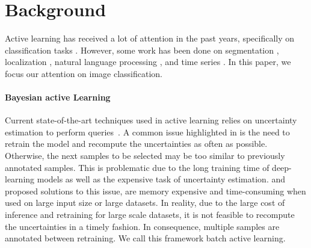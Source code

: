 \documentclass{article}
\newcommand{\todo}[1]{{\color{blue}TODO #1}}
\begin{document}
\section{Background}\label{background}
Active learning has received a lot of attention in the past years, specifically on classification tasks \citep{gal2017deep}. However, some work has been done on segmentation \citep{kendall2017uncertainties}, localization \citep{miller2019evaluating}, natural language processing \citep{siddhant2018deep}, and time series \citep{peng2017acts}. In this paper, we focus our attention on image classification. %

\paragraph{Bayesian active Learning}
Current state-of-the-art techniques used in active learning relies on uncertainty estimation to perform queries~\citep{gal2017deep}.
A common issue highlighted in \citet{tsymbalov2019deeper, kirsch2019batchbald} is the need to retrain the model and recompute the uncertainties as often as possible. Otherwise, the next samples to be selected may be too similar to previously annotated samples. This is problematic due to the long training time of deep-learning models as well as the expensive task of uncertainty estimation.
\citet{tsymbalov2019deeper, houlsby2011bayesian} and \citet{Wilson2015DeepKL} proposed solutions to this issue, are memory expensive and time-consuming when used on large input size or large datasets.
In reality, due to the large cost of inference and retraining for large scale datasets, it is not feasible to recompute the uncertainties in a timely fashion. In consequence, multiple samples are annotated between retraining. We call this framework batch active learning.
\end{document}
